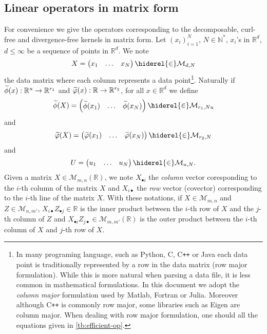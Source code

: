 \subsection{Linear operators in matrix form}
For convenience we give the operators corresponding to the decomposable,
curl-free and divergence-free kernels in matrix form. Let $(x_i)_{i=1}^N$,
$N\in\mathbb{N}^*$, $x_i$'s in $\mathbb{R}^d$, $d\le\infty$ be a sequence of
points in $\mathbb{R}^d$. We note
\begin{dmath*}
    X=\begin{pmatrix}x_1 & \hdots &
    x_N\end{pmatrix}\hiderel{\in}\mathcal{M}_{d,N}
\end{dmath*}
the data matrix where each column represents a data point\footnote{In many
programing language, such as Python, C, C{}\verb!++! or Java each data point is
traditionally represented by a row in the data matrix (row major formulation).
While this is more natural when parsing a data file, it is less common in
mathematical formulations. In this document we adopt the \emph{column major}
formulation used by Matlab, Fortran or Julia. Moreover although C{}\verb!++! is
commonly row major, some libraries such as Eigen are column major. When dealing
with row major formulation, one should  all the equations given
in \cref{tb:efficient-op}.}. Naturally if
$\tildePhi{\omega}(x):\mathbb{R}^u\to\mathbb{R}^{r_1}$ and
$\widetilde{\varphi}(x):\mathbb{R}\to\mathbb{R}^{r_2}$, for all
$x\in\mathbb{R}^d$ we define
\begin{dmath*}
    \tildePhi{\omega}(X)=\begin{pmatrix}\tildePhi{\omega}(x_1) & \hdots &
    \tildePhi{\omega}(x_N)\end{pmatrix}\hiderel{\in}\mathcal{M}_{r_1,Nu}
\end{dmath*}
and
\begin{dmath*}
    \tildephi{\omega}(X)=\begin{pmatrix}\tildephi{\omega}(x_1) & \hdots &
    \tildephi{\omega}(x_N)\end{pmatrix}\hiderel{\in}\mathcal{M}_{r_2, N}
\end{dmath*}
and
\begin{dmath*}
    U=\begin{pmatrix} u_1 & \hdots&  u_N
    \end{pmatrix}\hiderel{\in}\mathcal{M}_{u, N}.
\end{dmath*}
Given a matrix $X\in\mathcal{M}_{m,n}(\mathbb{R})$, we note $X_{\bullet i}$ the
\emph{column} vector coresponding to the $i$-th column of the matrix $X$ and
$X_{i \bullet}$ the \emph{row} vector (covector) corresponding to the $i$-th
line of the matrix $X$. With these notations, if $X\in\mathcal{M}_{m,n}$ and
$Z\in\mathcal{M}_{n,m'}$, $X_{i\bullet}Z_{\bullet j}\in\mathbb{R}$ is the inner
product between the $i$-th row of $X$ and the $j$-th column of $Z$ and
$X_{\bullet i} Z_{j \bullet}\in\mathcal{M}_{m,m'}(\mathbb{R})$ is the outer
product between the $i$-th column of $X$ and $j$-th row of $X$.
